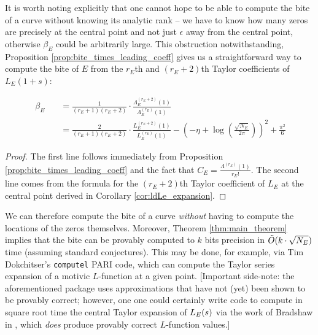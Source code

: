 It is worth noting explicitly that one cannot hope to be able to compute the bite of a curve without knowing its analytic rank -- we have to know how many zeros are precisely at the central point and not just $\epsilon$ away from the central point, otherwise $\beta_E$ could be arbitrarily large. This obstruction notwithstanding, Proposition \ref{prop:bite_times_leading_coeff} gives us a straightforward way to compute the bite of $E$ from the $r_E$th and $(r_E+2)$th Taylor coefficients of $L_E(1+s)$:
\begin{corollary}[GRH]
\begin{align}\
\beta_E \quad &= \frac{1}{(r_E+1)(r_E+2)} \cdot \frac{\Lambda_E^{(r_E+2)}(1)}{\Lambda_E^{(r_E)}(1)} \label{eqn:bite_via_Lams} \\
&= \frac{2}{(r_E+1)(r_E+2)} \cdot \frac{L_E^{(r_E+2)}(1)}{L_E^{(r_E)}(1)} - \left(-\eta+\log\left(\frac{\sqrt{N_E}}{2\pi}\right)\right)^2 + \frac{\pi^2}{6} \label{eqn:bite_via_L_E}
\end{align}
\end{corollary}
\begin{proof}
The first line follows immediately from Proposition \ref{prop:bite_times_leading_coeff} and the fact that $C_E = \frac{\Lambda^{(r_E)}(1)}{r_E!}$. The second line comes from the formula for the $(r_E+2)$th Taylor coefficient of $L_E$ at the central point derived in Corollary \ref{cor:ldLe_expansion}.
\end{proof}
We can therefore compute the bite of a curve {\it without} having to compute the locations of the zeros themselves. Moreover, Theorem \ref{thm:main_theorem} implies that the bite can be provably computed to $k$ bits precision in $\tilde{O}(k\cdot \sqrt{N_E})$ time (assuming standard conjectures). This may be done, for example, via Tim Dokchitser's {\tt computel} PARI code, which can compute the Taylor series expansion of a motivic $L$-function at a given point. [Important side-note: the aforementioned package uses approximations that have not (yet) been shown to be provably correct; however, one one could certainly write code to compute in square root time the central Taylor expansion of $L_E(s)$ via the work of Bradshaw in \cite{Bra-2010}, which {\it does} produce provably correct $L$-function values.] \\

